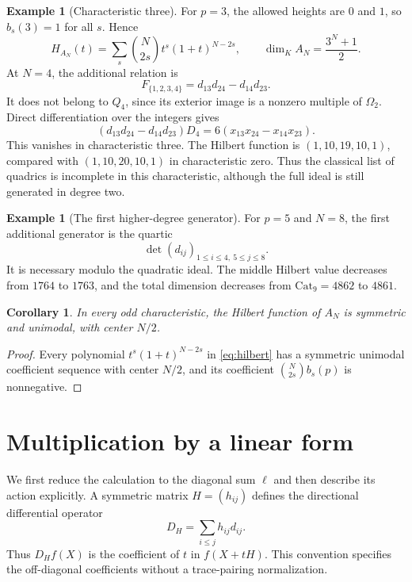 \documentclass[11pt]{article}
\newtheorem{corollary}[theorem]{Corollary}
\theoremstyle{definition}
\newtheorem{example}[theorem]{Example}
\theoremstyle{remark}
\numberwithin{equation}{section}
\newcommand{\kk}{K}
\newcommand{\Cat}{\mathrm{Cat}}
\begin{document}
\begin{example}[Characteristic three]\label{ex:three}
For $p=3$, the allowed heights are $0$ and $1$, so $b_s(3)=1$ for all
$s$. Hence
\begin{equation}\label{eq:p3length}
 H_{A_N}(t)=\sum_s\binom{N}{2s}t^s(1+t)^{N-2s},\qquad
 \dim_\kk A_N=\frac{3^N+1}{2}.
\end{equation}
At $N=4$, the additional relation is
\[
 F_{\{1,2,3,4\}}=d_{13}d_{24}-d_{14}d_{23}.
\]
It does not belong to $Q_4$, since its exterior image is a nonzero
multiple of $\Omega_2$. Direct differentiation over the integers gives
\begin{equation}\label{eq:p3direct}
 (d_{13}d_{24}-d_{14}d_{23})D_4
       =6(x_{13}x_{24}-x_{14}x_{23}).
\end{equation}
This vanishes in characteristic three. The Hilbert function is
$(1,10,19,10,1)$, compared with $(1,10,20,10,1)$ in characteristic zero.
Thus the classical list of quadrics is incomplete in this characteristic,
although the full ideal is still generated in degree two.
\end{example}

\begin{example}[The first higher-degree generator]
For $p=5$ and $N=8$, the first additional generator is the quartic
\[
 \det(d_{ij})_{1\leq i\leq4,\ 5\leq j\leq8}.
\]
It is necessary modulo the quadratic ideal. The middle Hilbert value
decreases from $1764$ to $1763$, and the total dimension decreases from
$\Cat_9=4862$ to $4861$.
\end{example}

\begin{corollary}\label{cor:unimodal}
In every odd characteristic, the Hilbert function of $A_N$ is symmetric
and unimodal, with center $N/2$.
\end{corollary}

\begin{proof}
Every polynomial $t^s(1+t)^{N-2s}$ in \eqref{eq:hilbert} has a symmetric
unimodal coefficient sequence with center $N/2$, and its coefficient
$\binom{N}{2s}b_s(p)$ is nonnegative.
\end{proof}

\section{Multiplication by a linear form}
\label{sec:lefschetz}

We first reduce the calculation to the diagonal sum $\ell$ and then
describe its action explicitly. A symmetric matrix $H=(h_{ij})$ defines
the directional differential operator
\[
 D_H=\sum_{i\leq j}h_{ij}d_{ij}.
\]
Thus $D_Hf(X)$ is the coefficient of $t$ in $f(X+tH)$. This convention
specifies the off-diagonal coefficients without a trace-pairing
normalization.
\end{document}
